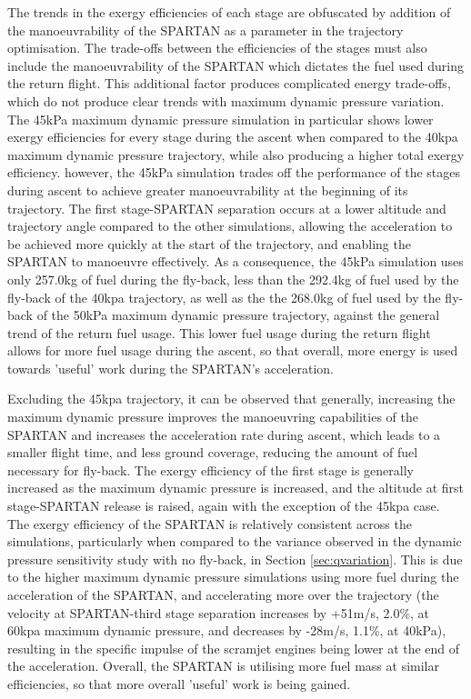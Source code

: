 The trends in the exergy efficiencies of each stage are obfuscated by addition of the manoeuvrability of the SPARTAN as a parameter in the trajectory optimisation. The trade-offs between the efficiencies of the stages must also include the manoeuvrability of the SPARTAN which dictates the fuel used during the return flight. This additional factor produces complicated energy trade-offs, which do not produce clear trends with maximum dynamic pressure variation. The 45kPa maximum dynamic pressure simulation in particular shows lower exergy efficiencies for every stage during the ascent when compared to the 40kpa maximum dynamic pressure trajectory, while also producing a higher total exergy efficiency. however, the 45kPa simulation trades off the performance of the stages during ascent to achieve greater manoeuvrability at the beginning of its trajectory. The first stage-SPARTAN separation occurs at a lower altitude and trajectory angle compared to the other simulations, allowing the acceleration to be achieved more quickly at the start of the trajectory, and enabling the SPARTAN to manoeuvre effectively. 
 As a consequence, the 45kPa simulation uses only 257.0kg of fuel during the fly-back, less than the 292.4kg of fuel used by the fly-back of the 40kpa trajectory, as well as the the 268.0kg of fuel used by the fly-back of the 50kPa maximum dynamic pressure trajectory, against the general trend of the return fuel usage. This lower fuel usage during the return flight allows for more fuel usage during the ascent, so that overall, more energy is used towards 'useful' work during the SPARTAN's acceleration. 

Excluding the 45kpa trajectory, it can be observed that generally, increasing the maximum dynamic pressure improves the manoeuvring capabilities of the SPARTAN and increases the acceleration rate during ascent, which leads to a smaller flight time, and less ground coverage, reducing the amount of fuel necessary for fly-back. 
The exergy efficiency of the first stage is generally increased as the maximum dynamic pressure is increased, and the altitude at first stage-SPARTAN release is raised, again with the exception of the 45kpa case. 
The exergy efficiency of the SPARTAN is relatively consistent across the simulations, particularly when compared to the variance observed in the dynamic pressure sensitivity study with no fly-back, in Section \ref{sec:qvariation}.
This is due to the higher maximum dynamic pressure simulations using more fuel during the acceleration of the SPARTAN, and accelerating more over the trajectory (the velocity at SPARTAN-third stage separation increases by +51m/s, 2.0\%, at 60kpa maximum dynamic pressure, and decreases by -28m/s, 1.1\%, at 40kPa), resulting in the specific impulse of the scramjet engines being lower at the end of the acceleration. Overall, the SPARTAN is utilising more fuel mass at similar efficiencies, so that more overall 'useful' work is being gained. 




